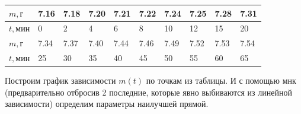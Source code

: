 \documentclass[a4paper,12pt]{article}
\begin{document}
  	  	\begin{center}
  		\begin{tabular}{|l|l|l|l|l|l|l|l|l|l|}
  			\hline
  			$m, г$   & 7.16 & 7.18 & 7.20 & 7.21 & 7.22 & 7.24 & 7.25 & 7.28 & 7.31 \\ \hline
  			$	t, мин$ & 0    & 2    & 4    & 6    & 8    & 10   & 12   & 15   & 20   \\ \hline
  			$m, г $ & 7.34 & 7.37 & 7.40 & 7.44 & 7.46 & 7.49 & 7.52 & 7.53 & 7.54 \\ \hline
  			$	t, мин$ & 25   & 30   & 35   & 40   & 45   & 50   & 55   & 60   & 65   \\ \hline
  		\end{tabular}
  	\end{center}
  	
  	Построим график зависимости $m(t)$ по точкам из таблицы. И с помощью мнк (предварительно отбросив 2 последние, которые явно выбиваются из линейной зависимости) определим параметры наилучшей прямой.
  	
  			
%	  		
% 	
\end{document}
